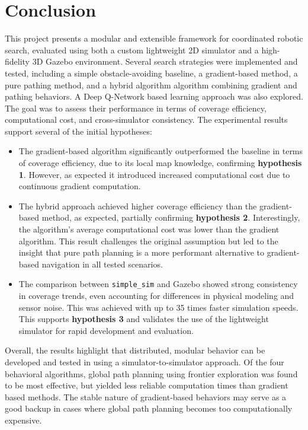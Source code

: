 \section{Conclusion}
\label{sec:Conclusion}
This project presents a modular and extensible framework for coordinated robotic search, evaluated using both a custom lightweight 2D simulator and a high-fidelity 3D Gazebo environment. Several search strategies were implemented and tested, including a simple obstacle-avoiding baseline, a gradient-based method, a pure pathing method, and a hybrid algorithm algorithm combining gradient and pathing behaviors. A Deep Q-Network based learning approach was also explored. The goal was to assess their performance in terms of coverage efficiency, computational cost, and cross-simulator consistency. The experimental results support several of the initial hypotheses:

\begin{itemize}
    \item The gradient-based algorithm significantly outperformed the baseline in terms of coverage efficiency, due to its local map knowledge, confirming \textbf{hypothesis 1}. However, as expected it introduced increased computational cost due to continuous gradient computation.

    \item The hybrid approach achieved higher coverage efficiency than the gradient-based method, as expected, partially confirming \textbf{hypothesis 2}. Interestingly, the algorithm's average computational cost was lower than the gradient algorithm. This result challenges the original assumption but led to the insight that pure path planning is a more performant alternative to gradient-based navigation in all tested scenarios.

    \item The comparison between \texttt{simple\_sim} and Gazebo showed strong consistency in coverage trends, even accounting for differences in physical modeling and sensor noise. This was achieved with up to 35 times faster simulation speeds. This supports \textbf{hypothesis 3} and validates the use of the lightweight simulator for rapid development and evaluation.

\end{itemize}

Overall, the results highlight that distributed, modular behavior can be developed and tested in using a simulator-to-simulator approach. Of the four behavioral algorithms, global path planning using frontier exploration was found to be most effective, but yielded less reliable computation times than gradient based methods. The stable nature of gradient-based behaviors may serve as a good backup in cases where global path planning becomes too computationally expensive.
